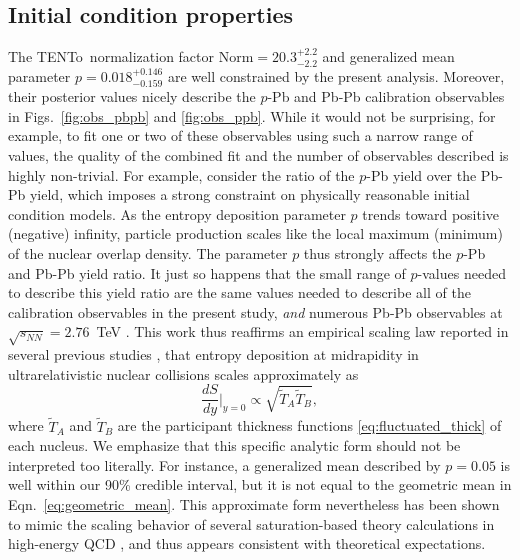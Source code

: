 \documentclass[aps,prc,reprint,amsmath,nofootinbib]{revtex4-1}
\newcommand{\trento}{T\raisebox{-0.5ex}{R}ENTo}
\newcommand{\sqrts}{\sqrt{s_{NN}}}
\newcommand{\T}{\tilde{T}}
\newenvironment{fullpage}{\onecolumngrid}{\clearpage\twocolumngrid}
\begin{document}
\begin{fullpage}
\begin{figure}
\end{figure}
\end{fullpage}

\subsection{Initial condition properties}

The \trento\ normalization factor ${\text{Norm} = 20.3^{+2.2}_{-2.2}}$ and generalized mean parameter $p=0.018^{+0.146}_{-0.159}$ are well constrained by the present analysis.
Moreover, their posterior values nicely describe the $p$-Pb and Pb-Pb calibration observables in Figs.~\ref{fig:obs_pbpb} and \ref{fig:obs_ppb}.
While it would not be surprising, for example, to fit one or two of these observables using such a narrow range of values, the quality of the combined fit and the number of observables described is highly non-trivial.
For example, consider the ratio of the $p$-Pb yield over the Pb-Pb yield, which imposes a strong constraint on physically reasonable initial condition models.
As the entropy deposition parameter $p$ trends toward positive (negative) infinity, particle production scales like the local maximum (minimum) of the nuclear overlap density.
The parameter $p$ thus strongly affects the $p$-Pb and Pb-Pb yield ratio.
It just so happens that the small range of $p$-values needed to describe this yield ratio are the same values needed to describe all of the calibration observables in the present study, \emph{and} numerous Pb-Pb observables at $\sqrts=2.76$~TeV \cite{Bernhard:2018hnz}.
This work thus reaffirms an empirical scaling law reported in several previous studies \cite{Moreland:2014oya, Bernhard:2016tnd, Ke:2016jrd, Bernhard:2018hnz}, that entropy deposition at midrapidity in ultrarelativistic nuclear collisions scales approximately as
\begin{equation}
  \label{eq:geometric_mean}
  \frac{dS}{dy}\bigg\vert_{y=0} \propto \sqrt{\T_A \T_B},
\end{equation}
where $\T_A$ and $\T_B$ are the participant thickness functions \eqref{eq:fluctuated_thick} of each nucleus.
We emphasize that this specific analytic form should not be interpreted too literally.
For instance, a generalized mean described by $p=0.05$ is well within our 90\% credible interval, but it is not equal to the geometric mean in Eqn.~\ref{eq:geometric_mean}.
This approximate form nevertheless has been shown to mimic the scaling behavior of several saturation-based theory calculations in high-energy QCD \cite{Bernhard:2016tnd}, and thus appears consistent with theoretical expectations.
\end{document}
